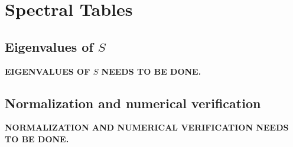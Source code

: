\chapter{Spectral Tables}
\section{Eigenvalues of $S$}

\noindent\textbf{EIGENVALUES OF $S$ NEEDS TO BE DONE.}


\section{Normalization and numerical verification}

\noindent\textbf{NORMALIZATION AND NUMERICAL VERIFICATION NEEDS TO BE DONE.}


